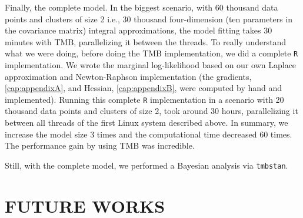 Finally, the complete model. In the biggest scenario, with 60 thousand
data points and clusters of size 2 i.e., 30 thousand four-dimension (ten
parameters in the covariance matrix) integral approximations, the model
fitting takes 30 minutes with TMB, parallelizing it between the
threads. To really understand what we were doing, before doing the TMB
implementation, we did a complete \texttt{R} implementation. We wrote
the marginal log-likelihood based on our own Laplace approximation and
Newton-Raphson implementation (the gradients, \autoref{cap:appendixA},
and Hessian, \autoref{cap:appendixB}, were computed by hand and
implemented). Running this complete \texttt{R} implementation in a
scenario with 20 thousand data points and clusters of size 2, took
around 30 hours, parallelizing it between all threads of the first Linux
system described above. In summary, we increase the model size 3 times
and the computational time decreased 60 times. The performance gain by
using TMB was incredible.

Still, with the complete model, we performed a Bayesian analysis via
\texttt{tmbstan}.

\section{FUTURE WORKS}
\label{cap:future}

